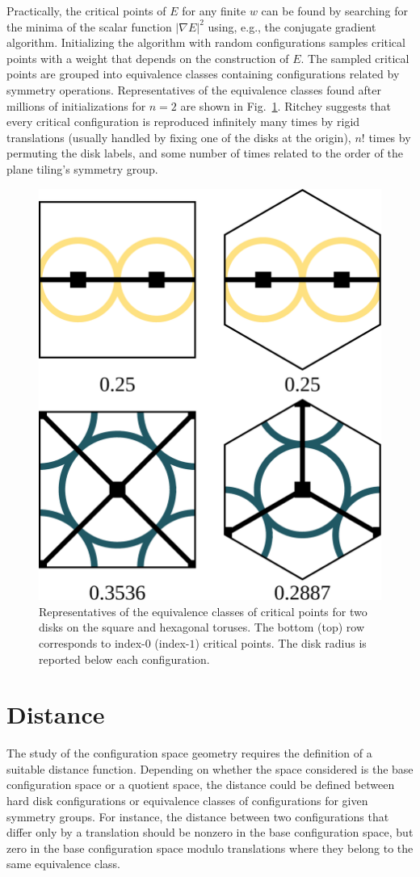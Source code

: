 \documentclass[default,iicol]{sn-jnl}%
\theoremstyle{thmstyleone}%
\theoremstyle{thmstyletwo}%
\theoremstyle{thmstylethree}%
\begin{document}
Practically, the critical points of $E$ for any finite $w$ can be found by searching for the minima of the scalar function $\lvert\nabla E\rvert^2$ using, e.g., the conjugate gradient algorithm. Initializing the algorithm with random configurations samples critical points with a weight that depends on the construction of $E$. The sampled critical points are grouped into equivalence classes containing configurations related by symmetry operations. Representatives of the equivalence classes found after millions of initializations for $n = 2$ are shown in Fig.\ \ref{fig:figure3}. Ritchey \cite{ritcheyphd} suggests that every critical configuration is reproduced infinitely many times by rigid translations (usually handled by fixing one of the disks at the origin), $n!$ times by permuting the disk labels, and some number of times related to the order of the plane tiling's symmetry group.

\begin{figure}
	\centering
	\includegraphics[width=0.5\columnwidth]{figure3.eps}
	\caption{Representatives of the equivalence classes of critical points for two disks on the square and hexagonal toruses. The bottom (top) row corresponds to index-$0$ (index-$1$) critical points. The disk radius is reported below each configuration.}
	\label{fig:figure3}
\end{figure}


\section{Distance}
\label{sec:distance_config}

The study of the configuration space geometry requires the definition of a suitable distance function. Depending on whether the space considered is the base configuration space or a quotient space, the distance could be defined between hard disk configurations or equivalence classes of configurations for given symmetry groups. For instance, the distance between two configurations that differ only by a translation should be nonzero in the base configuration space, but zero in the base configuration space modulo translations where they belong to the same equivalence class.
\end{document}
